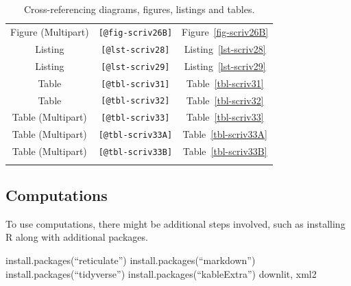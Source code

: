 \documentclass[
  12pt,
  a4paper,
  oneside,
  titlepage,
  toclink=all,
  toc=bibliography]{scrbook}
\theoremstyle{definition}
\theoremstyle{plain}
\theoremstyle{plain}
\theoremstyle{plain}
\theoremstyle{plain}
\theoremstyle{definition}
\theoremstyle{definition}
\theoremstyle{plain}
\theoremstyle{remark}
\begin{document}
\begin{longtable}[]{@{}ccc@{}}
Figure (Multipart) & \texttt{{[}@fig-scriv26B{]}} &
\protect\hypertarget{cite_38}{}{\label{cite_38}Figure~\ref{fig-scriv26B}} \\
Listing & \texttt{{[}@lst-scriv28{]}} &
\protect\hypertarget{cite_39}{}{\label{cite_39}Listing~\ref{lst-scriv28}} \\
Listing & \texttt{{[}@lst-scriv29{]}} &
\protect\hypertarget{cite_40}{}{\label{cite_40}Listing~\ref{lst-scriv29}} \\
Table & \texttt{{[}@tbl-scriv31{]}} &
\protect\hypertarget{cite_41}{}{\label{cite_41}Table~\ref{tbl-scriv31}} \\
Table & \texttt{{[}@tbl-scriv32{]}} &
\protect\hypertarget{cite_42}{}{\label{cite_42}Table~\ref{tbl-scriv32}} \\
Table (Multipart) & \texttt{{[}@tbl-scriv33{]}} &
\protect\hypertarget{cite_43}{}{\label{cite_43}Table~\ref{tbl-scriv33}} \\
Table (Multipart) & \texttt{{[}@tbl-scriv33A{]}} &
\protect\hypertarget{cite_44}{}{\label{cite_44}Table~\ref{tbl-scriv33A}} \\
Table (Multipart) & \texttt{{[}@tbl-scriv33B{]}} &
\protect\hypertarget{cite_45}{}{\label{cite_45}Table~\ref{tbl-scriv33B}} \\
\caption{\label{tbl-scriv13}Cross-referencing diagrams, figures,
listings and tables.}\tabularnewline
\end{longtable}

\hypertarget{sec-scriv14}{%
\subsection{Computations}\label{sec-scriv14}}

\protect\hypertarget{scriv14}{}{}

To use computations, there might be additional steps involved, such as
installing R along with additional packages.

install.packages(\enquote{reticulate})
install.packages(\enquote{markdown})
install.packages(\enquote{tidyverse})
install.packages(\enquote{kableExtra}) downlit, xml2
\end{document}
